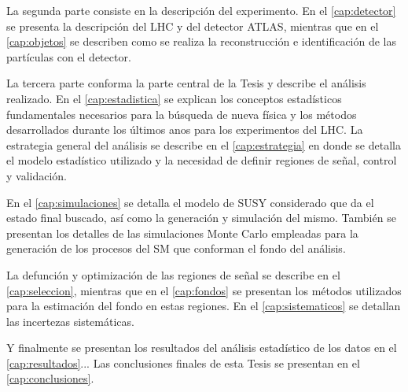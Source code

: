La segunda parte consiste en la descripción del experimento. En el
\cref{cap:detector} se presenta la descripción del LHC y del detector ATLAS,
mientras que en el \cref{cap:objetos} se describen como se realiza la
reconstrucción e identificación de las partículas con el detector.

La tercera parte conforma la parte central de la Tesis y describe el análisis
realizado. En el \cref{cap:estadistica} se explican los conceptos estadísticos
fundamentales necesarios para la búsqueda de nueva física y los métodos
desarrollados durante los últimos anos para los experimentos del LHC. La
estrategia general del análisis se describe en el \cref{cap:estrategia} en donde
se detalla el modelo estadístico utilizado y la necesidad de definir regiones de
señal, control y validación.

En el \cref{cap:simulaciones} se detalla el modelo de SUSY considerado que da el
estado final buscado, así como la generación y simulación del mismo. También se
presentan los detalles de las simulaciones Monte Carlo empleadas para la
generación de los procesos del SM que conforman el fondo del análisis.

La defunción y optimización de las regiones de señal se describe en el
\cref{cap:seleccion}, mientras que en el \cref{cap:fondos} se presentan los
métodos utilizados para la estimación del fondo en estas regiones. En el
\cref{cap:sistematicos} se detallan las incertezas sistemáticas.

Y finalmente se presentan los resultados del análisis estadístico de los datos
en el \cref{cap:resultados}... Las conclusiones finales de esta Tesis se
presentan en el \cref{cap:conclusiones}.
